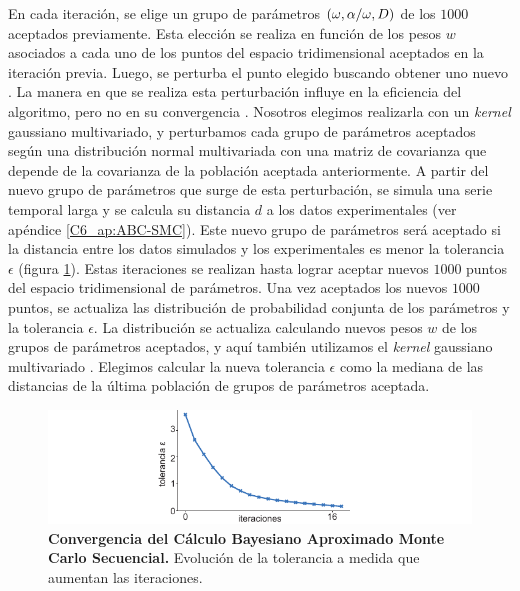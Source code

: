 \documentclass[./main.tex]{subfiles}
\begin{document}
En cada iteración, se elige un grupo de parámetros $(\omega,\alpha/\omega,D)$ de los $1000$ aceptados previamente. Esta elección se realiza en función de los pesos $w$ asociados a cada uno de los puntos del espacio tridimensional aceptados en la iteración previa. Luego, se perturba el punto elegido buscando obtener uno nuevo \cite{Toni2009}. La manera en que se realiza esta perturbación influye en la eficiencia del algoritmo, pero no en su convergencia \cite{Filippi2013}. Nosotros elegimos realizarla con un \textit{kernel} gaussiano multivariado, y perturbamos cada grupo de parámetros aceptados según una distribución normal multivariada con una matriz de covarianza que depende de la covarianza de la población aceptada anteriormente. A partir del nuevo grupo de parámetros que surge de esta perturbación, se simula una serie temporal larga y se calcula su distancia $d$ a los datos experimentales (ver apéndice \ref{C6_ap:ABC-SMC}). Este nuevo grupo de parámetros será aceptado si la distancia entre los datos simulados y los experimentales es menor la tolerancia $\epsilon$ (figura \ref{C6_fig:eps}). Estas iteraciones se realizan hasta lograr aceptar nuevos $1000$ puntos del espacio tridimensional de parámetros. Una vez aceptados los nuevos $1000$ puntos, se actualiza las distribución de probabilidad conjunta de los parámetros y la tolerancia $\epsilon$. La distribución se actualiza calculando nuevos pesos $w$ de los grupos de parámetros aceptados, y aquí también utilizamos el \textit{kernel} gaussiano multivariado \cite{Toni2009}. Elegimos calcular la nueva tolerancia $\epsilon$ como la mediana de las distancias de la última población de grupos de parámetros aceptada. 

\begin{figure}
    \centering
    \includegraphics[width=1\columnwidth]{figures/chapter6/C6_eps.pdf} 
    \caption{\textbf{Convergencia del Cálculo Bayesiano Aproximado Monte Carlo Secuencial.} Evolución de la tolerancia a medida que aumentan las iteraciones.}
    \label{C6_fig:eps}
\end{figure} 
\end{document}
